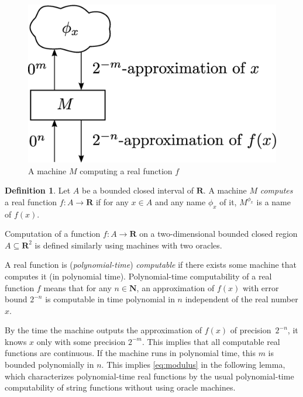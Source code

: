 \documentclass[12pt,a4paper]{article}
\theoremstyle{definition}
\newtheorem{definition}[theorem]{Definition}
\theoremstyle{remark}
\newcommand{\R}{\mathbf R}
\newcommand{\N}{\mathbf N}
\begin{document}
\begin{figure}
 \begin{center}
  \includegraphics[height=0.17\textheight]{image/model-of-function.eps}
 \end{center}
 \caption{A machine $M$ computing a real function $f$}
 \label{fig:model-of-function}
\end{figure}

\begin{definition}
Let $A$ be a bounded closed interval of\/ $\R$.
A machine $M$ \emph{computes} a real function $f \colon A \to \R$ 
if for any $x \in A$ and any name $\phi_x$ of it,
$M^{\phi_x}$ is a name of $f(x)$.
\end{definition}

Computation of a function $f \colon A \to \R$ on
a two-dimensional bounded closed region $A \subseteq \R ^2$ 
is defined similarly using machines with two oracles.

A real function is (\emph{polynomial-time}) \emph{computable} if there exists some machine that computes it (in polynomial time).
Polynomial-time computability of a real function $f$ means that
for any $n \in \N$, 
an approximation of $f(x)$ with error bound $2^{-n}$
is computable in time polynomial in $n$ 
independent of the real number $x$.

By the time the machine outputs the approximation of $f (x)$ of precision~$2 ^{-n}$, 
it knows $x$ only with some precision $2 ^{-m}$.
This implies that all computable real functions are continuous.
If the machine runs in polynomial time,
this $m$ is bounded polynomially in $n$.
This implies \eqref{eq:modulus} in the following lemma, 
which characterizes polynomial-time real functions
by the usual polynomial-time computability of string functions 
without using oracle machines. 
\end{document}
